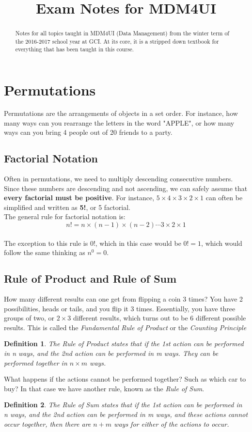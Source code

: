 \documentclass[final,1p,12pt]{elsarticle}
\newtheorem{definition}{Definition}
\begin{document}
\begin{frontmatter}
    \title{Exam Notes for MDM4UI}
    \begin{abstract}
        Notes for all topics taught in MDM4UI (Data Management) from the winter term of the 2016-2017 school year at GCI. At its core, it is a stripped down textbook for everything that has been taught in this course.
    \end{abstract}
\end{frontmatter}

\section{Permutations}
Permutations are the arrangements of objects in a set order. 
For instance, how many ways can you rearrange the letters in the word "APPLE", 
or how many ways can you bring 4 people out of 20 friends to a party.

    \subsection{Factorial Notation}
    Often in permutations, we need to multiply descending consecutive numbers. Since these numbers
    are descending and not ascending, we can safely assume that \textbf{every factorial must be positive}. 
    For instance,  $5\times4\times3\times2\times1$ can often be simplified and written as \textbf{5!}, or 5 factorial.\\
    The general rule for factorial notation is: \[ n! = n\times(n-1)\times(n-2)\cdots3\times2\times1 \]\\
    The exception to this rule is 0!, which in this case would be $0! = 1$, which would follow the same thinking as $n^0=0$.
    
    \subsection{Rule of Product and Rule of Sum}
    How many different results can one get from flipping a coin 3 times? You have 2 possibilities, heads or tails, and you flip it 3 times. Essentially, you have three groups of two, or $2\times3$ different results, which turns out to be $6$ different possible results. This is called the \emph{Fundamental Rule of Product} or the \emph{Counting Principle}
    \begin{definition}
        The Rule of Product states that if the 1st action can be performed in n ways, and the 2nd action can be performed in m ways.
        They can be performed together in $n\times m$ ways. 
    \end{definition}
    \clearpage
    What happens if the actions cannot be performed together? Such as which car to buy? In that case we have another rule, known as the \emph{Rule of Sum}.
    \begin{definition}
        The Rule of Sum states that if the 1st action can be performed in n ways, and the 2nd action can be performed in m ways, and these actions cannot occur together, then there are $n+m$ ways for either of the actions to occur.
    \end{definition}
    
\end{document}
